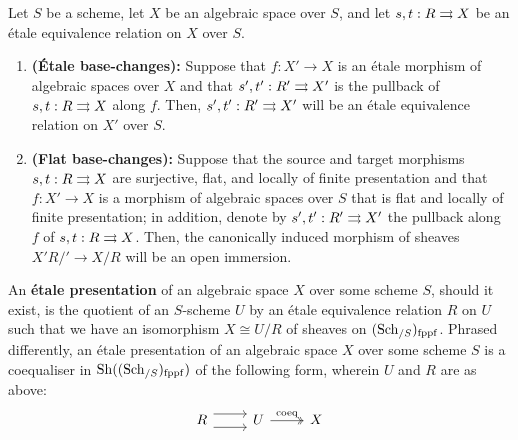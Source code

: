             \begin{proposition} \label{prop: base_changing_etale_and_flat_equivalence_relations_in_algebraic_spaces}
                Let $S$ be a scheme, let $X$ be an algebraic space over $S$, and let $s, t: R \rightrightarrows X$ be an \'etale equivalence relation on $X$ over $S$.
                    \begin{enumerate}
                        \item \textbf{(\'Etale base-changes):} Suppose that $f: X' \to X$ is an \'etale morphism of algebraic spaces over $X$ and that $s', t': R' \rightrightarrows X'$ is the pullback of $s, t: R \rightrightarrows X$ along $f$. Then, $s', t': R' \rightrightarrows X'$ will be an \'etale equivalence relation on $X'$ over $S$.
                        \item \textbf{(Flat base-changes):} Suppose that the source and target morphisms $s, t: R \rightrightarrows X$ are surjective, flat, and locally of finite presentation and that $f: X' \to X$ is a morphism of algebraic spaces over $S$ that is flat and locally of finite presentation; in addition, denote by $s', t': R' \rightrightarrows X'$ the pullback along $f$ of $s, t: R \rightrightarrows X$. Then, the canonically induced morphism of sheaves $X'R/' \to X/R$ will be an open immersion. 
                    \end{enumerate}
            \end{proposition}
            \begin{definition} \label{def: etale_presentations_of_algebraic_spaces}
                An \textbf{\'etale presentation} of an algebraic space $X$ over some scheme $S$, should it exist, is the quotient of an $S$-scheme $U$ by an \'etale equivalence relation $R$ on $U$ such that we have an isomorphism $X \cong U/R$ of sheaves on $(\mathrm{Sch}_{/S})_{\mathrm{fppf}}$. Phrased differently, an \'etale presentation of an algebraic space $X$ over some scheme $S$ is a coequaliser in $\mathrm{Sh}((\mathrm{Sch}_{/S})_{\mathrm{fppf}})$ of the following form, wherein $U$ and $R$ are as above:
                    $$
                        \begin{tikzcd}
                        	R & U & X
                        	\arrow[shift right=2, from=1-1, to=1-2]
                        	\arrow[shift left=2, from=1-1, to=1-2]
                        	\arrow["\coeq", two heads, from=1-2, to=1-3]
                        \end{tikzcd}
                    $$
            \end{definition}
